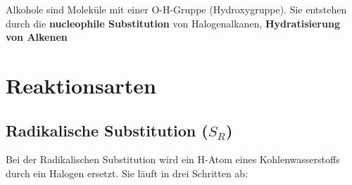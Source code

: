 \documentclass[a4paper]{article}
\begin{document}
Alkohole sind Moleküle mit einer O-H-Gruppe (Hydroxygruppe). Sie entstehen durch die
\textbf{nucleophile Substitution} von Halogenalkanen, \textbf{Hydratisierung von Alkenen}








\section{Reaktionsarten}
\subsection{Radikalische Substitution ($S_R$)}

Bei der Radikalischen Substitution wird ein H-Atom eines Kohlenwasserstoffs durch ein Halogen ersetzt.
Sie läuft in drei Schritten ab:\\
\end{document}
